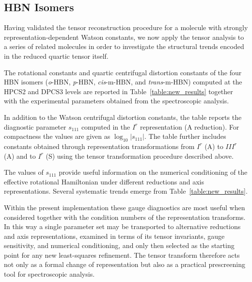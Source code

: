 \subsection{HBN Isomers}

Having validated the tensor reconstruction procedure for a molecule
with strongly representation-dependent Watson constants, we now apply
the tensor analysis to a series of related molecules in order to
investigate the structural trends encoded in the reduced quartic
tensor itself.

The rotational constants and quartic centrifugal distortion constants
of the four HBN isomers (\emph{o}-HBN, \emph{p}-HBN, \emph{cis}-m-HBN,
and \emph{trans}-m-HBN) computed at the HPCS2 and DPCS3 levels are
reported in Table~\ref{table:new_results} together with the
experimental parameters obtained from the spectroscopic analysis.

In addition to the Watson centrifugal distortion constants, the table
reports the diagnostic parameter $s_{111}$ computed in the $I^r$
representation (A reduction). For compactness the values are given as
$\log_{10}|s_{111}|$. The table further includes constants obtained
through representation transformations from $I^r$ (A) to $III^r$ (A)
and to $I^r$ (S) using the tensor transformation procedure described
above.

The values of $s_{111}$ provide useful information on the numerical
conditioning of the effective rotational Hamiltonian under different
reductions and axis representations. Several systematic trends emerge
from Table~\ref{table:new_results}.

Within the present implementation these gauge diagnostics are most
useful when considered together with the condition numbers of the
representation transforms.  In this way a single parameter set may be
transported to alternative reductions and axis representations,
examined in terms of its tensor invariants, gauge sensitivity, and
numerical conditioning, and only then selected as the starting point
for any new least-squares refinement.  The tensor transform therefore
acts not only as a formal change of representation but also as a
practical prescreening tool for spectroscopic analysis.

